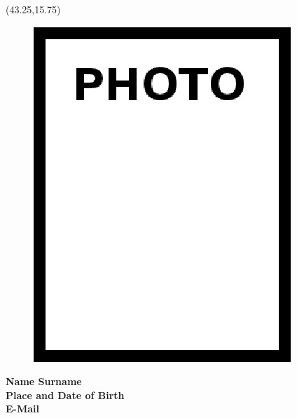 

\vspace*{10mm}
\setlength{\TPHorizModule}{10pt}
\setlength{\TPVertModule}{10pt}
\begin{textblock}{1}(43.25,15.75) %
	\begin{figure}[p]
		\includegraphics[scale=0.35,keepaspectratio=true]{98_Final_Sections/fig/photo}
	\end{figure}	
\end{textblock}
\vspace*{30mm}
\textbf{Name Surname\makebox[2.155cm]{\hfill \textbf{:}}}\hspace{0.225em} \\ %

\vspace{-3mm}
\textbf{Place and Date of Birth\makebox[0.735cm]{\hfill \textbf{:}}}\hspace{0.225em} \\ %

\vspace{-3mm}
\textbf{E-Mail\makebox[3.685cm]{\hfill \textbf{:}}}\hspace{0.225em} \\ %

